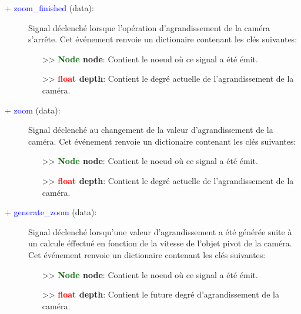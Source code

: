 \documentclass[a4paper, 11pt]{article}
\begin{document}
	\begin{description}
		\item [+ \textcolor{blue}{zoom\_finished} (data):] Signal déclenché lorsque l'opération 
		d'agrandissement de la caméra \\s'arrête. Cet événement renvoie un dictionaire contenant les clés 
		suivantes:
		\begin{itemize}
			\item [>> \textbf{\textcolor{darkgreen}{Node} node}:] Contient le noeud où ce signal a été émit.
			\item [>> \textbf{\textcolor{red}{float} depth}:] Contient le degré actuelle de
			l'agrandissement de la caméra.\\
		\end{itemize}
	\end{description}
	\begin{description}
		\item [+ \textcolor{blue}{zoom} (data):] Signal déclenché au changement de la valeur 
		d'agrandissement de la caméra. Cet événement renvoie un dictionaire contenant les clés suivantes:
		\begin{itemize}
			\item [>> \textbf{\textcolor{darkgreen}{Node} node}:] Contient le noeud où ce signal a été émit.
			\item [>> \textbf{\textcolor{red}{float} depth}:] Contient le degré actuelle de
			l'agrandissement de la caméra.\\
		\end{itemize}
	\end{description}
	\begin{description}
		\item [+ \textcolor{blue}{generate\_zoom} (data):] Signal déclenché lorsqu'une valeur 
		d'agrandissement a été générée suite à un calcule éffectué en fonction de la vitesse de l'objet 
		pivot de la caméra. Cet événement renvoie un dictionaire contenant les clés suivantes:
		\begin{itemize}
			\item [>> \textbf{\textcolor{darkgreen}{Node} node}:] Contient le noeud où ce signal a été émit.
			\item [>> \textbf{\textcolor{red}{float} depth}:] Contient le future degré d'agrandissement de 
			la caméra.\\
		\end{itemize}
	\end{description}
\end{document}
